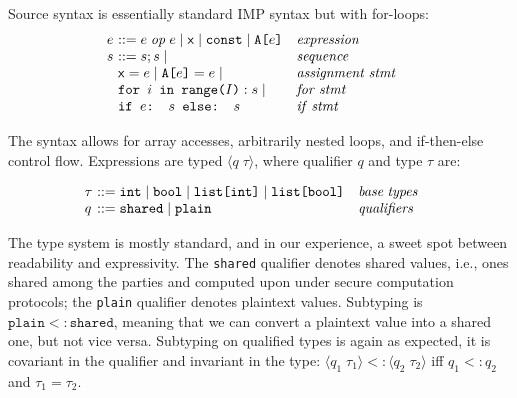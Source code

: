 Source syntax is essentially standard IMP syntax but with for-loops:
{\small
\[
\begin{array}{l@{~~~~~}l}
  \begin{array}{l@{~}l@{~~~}l}
 e & ::= e \; \mathit{op} \; e \mid \x \mid  \texttt{const} \mid \texttt{A[$e$]} & \mathit{expression} \\
  s & ::= s;s \mid  & \mathit{sequence} \\
  & \x = e \mid \texttt{A[$e$]} = e \mid & \mathit{assignment \; stmt} \\
  & \texttt{for $i$ in range($I$)}: s \mid & \mathit{for \; stmt} \\
  & \texttt{if $e$: $s$ else: $s$} & \mathit{if \; stmt} \\

  \end{array}
\end{array}
\]
}

The syntax allows for array accesses, arbitrarily nested loops, and if-then-else control flow.
Expressions are typed $\langle q \; \tau\rangle$, where qualifier $q$ and type $\tau$ are:

{\small
\[
\begin{array}{l@{~~~~~}l}
  \begin{array}{l@{~}l@{~~~}l}
 \tau & ::= \texttt{int}  \mid \texttt{bool} \mid \texttt{list[int]} \mid  \texttt{list[bool]} & \mathit{base \; types} \\
  q & ::= \texttt{shared} \mid \texttt{plain} & \mathit{qualifiers} \\
  \end{array}
\end{array}
\]
}

The type system is mostly standard, and in our experience, a sweet spot between readability and expressivity.
The \texttt{shared} qualifier denotes shared values, i.e., ones shared among the parties and computed upon
under secure computation protocols; the \texttt{plain} qualifier denotes plaintext values.
Subtyping is $\texttt{plain} <: \texttt{shared}$, meaning that we can convert a plaintext value into a shared one,
but not vice versa. Subtyping on qualified types is again as expected, it is covariant in the qualifier
and invariant in the type: $\langle q_1 \; \tau_1 \rangle <: \langle q_2 \; \tau_2 \rangle$
iff $q_1 <: q_2$ and  $\tau_1 = \tau_2$.

